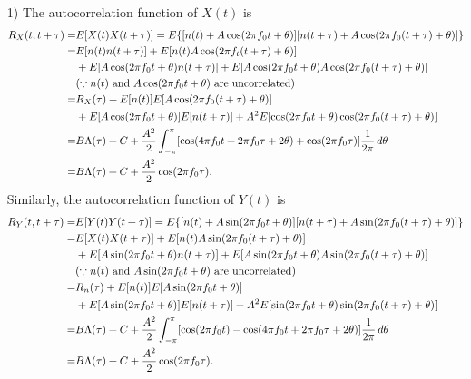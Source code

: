 \documentclass{assignment}
\begin{document}
\begin{sol}
    \begin{itemize}
        \item[1)] The autocorrelation function of $X(t)$ is
        \begin{align}
            \notag R_X(t,t+\tau)=&E[X(t)X(t+\tau)]=E\{[n(t)+A\cos(2\pi f_0t+\theta)][n(t+\tau)+A\cos(2\pi f_0(t+\tau)+\theta)]\}\\
            \notag=&E[n(t)n(t+\tau)]+E[n(t)A\cos(2\pi f_t(t+\tau)+\theta)]\\
            \notag&+E[A\cos(2\pi f_0t+\theta)n(t+\tau)]+E[A\cos(2\pi f_0t+\theta)A\cos(2\pi f_0(t+\tau)+\theta)]\\
            \notag&(\because n(t)\text{ and }A\cos(2\pi f_0t+\theta)\text{ are uncorrelated})\\
            \notag=&R_X(\tau)+E[n(t)]E[A\cos(2\pi f_0(t+\tau)+\theta)]\\
            \notag&+E[A\cos(2\pi f_0t+\theta)]E[n(t+\tau)]+A^2E[\cos(2\pi f_0t+\theta)\cos(2\pi f_0(t+\tau)+\theta)]\\
            \notag=&B\Lambda(\tau)+C+\frac{A^2}{2}\int_{-\pi}^{\pi}[\cos(4\pi f_0t+2\pi f_0\tau+2\theta)+\cos(2\pi f_0\tau)]\frac{1}{2\pi}\,d\theta\\
            =&B\Lambda(\tau)+C+\frac{A^2}{2}\cos(2\pi f_0\tau).
        \end{align}
        Similarly, the autocorrelation function of $Y(t)$ is
        \begin{align}
            \notag R_Y(t,t+\tau)=&E[Y(t)Y(t+\tau)]=E\{[n(t)+A\sin(2\pi f_0t+\theta)][n(t+\tau)+A\sin(2\pi f_0(t+\tau)+\theta)]\}\\
            \notag=&E[X(t)X(t+\tau)]+E[n(t)A\sin(2\pi f_0(t+\tau)+\theta)]\\
            \notag&+E[A\sin(2\pi f_0t+\theta)n(t+\tau)]+E[A\sin(2\pi f_0t+\theta)A\sin(2\pi f_0(t+\tau)+\theta)]\\
            \notag&(\because n(t)\text{ and }A\sin(2\pi f_0t+\theta)\text{ are uncorrelated})\\
            \notag=&R_n(\tau)+E[n(t)]E[A\sin(2\pi f_0t+\theta)]\\
            \notag&+E[A\sin(2\pi f_0t+\theta)]E[n(t+\tau)]+A^2E[\sin(2\pi f_0t+\theta)\sin(2\pi f_0(t+\tau)+\theta)]\\
            \notag=&B\Lambda(\tau)+C+\frac{A^2}{2}\int_{-\pi}^{\pi}[\cos(2\pi f_0t)-\cos(4\pi f_0t+2\pi f_0\tau+2\theta)]\frac{1}{2\pi}\,d\theta\\
            =&B\Lambda(\tau)+C+\frac{A^2}{2}\cos(2\pi f_0\tau).

\end{align}
\end{itemize}
\end{sol}
\end{document}

